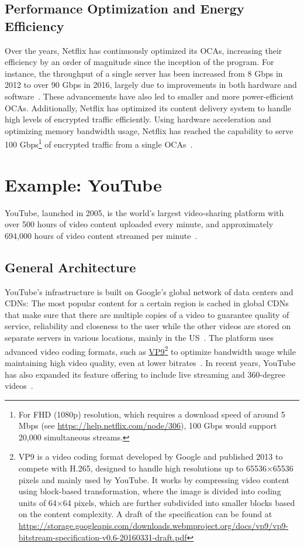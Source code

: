 \subsection{Performance Optimization and Energy Efficiency}

Over the years, Netflix has continuously optimized its \ac{OCAs}, increasing their efficiency by an order of magnitude since the inception of the program. For instance, the throughput of a single server has been increased from 8 Gbps in 2012 to over 90 Gbps in 2016, largely due to improvements in both hardware and software~\parencite{netflix_open_connect}. These advancements have also led to smaller and more power-efficient \ac{OCAs}.
Additionally, Netflix has optimized its content delivery system to handle high levels of encrypted traffic efficiently. Using hardware acceleration and optimizing memory bandwidth usage, Netflix has reached the capability to serve 100 Gbps\footnote{For FHD (1080p) resolution, which requires a download speed of around 5 Mbps (see \url{https://help.netflix.com/node/306}), 100 Gbps would support 20,000 simultaneous streams.} of encrypted traffic from a single \ac{OCAs}~\parencite{netflix_content_serving}.

\section{Example: YouTube}

YouTube, launched in 2005, is the world's largest video-sharing platform with over 500 hours of video content uploaded every minute, and approximately 694,000 hours of video content streamed per minute~\parencite{youtube_stats}.

\subsection{General Architecture}

YouTube's infrastructure is built on Google's global network of data centers and \ac{CDN}s: The most popular content for a certain region is cached in global \ac{CDN}s that make sure that there are multiple copies of a video to guarantee quality of service, reliability and closeness to the user while the other videos are stored on separate servers in various locations, mainly in the US~\parencite{youtube_architecture_2}. The platform uses advanced video coding formats, such as \href{https://developers.google.com/media/vp9}{VP9}\footnote{VP9 is a video coding format developed by Google and published 2013 to compete with H.265, designed to handle high resolutions up to 65536×65536 pixels and mainly used by YouTube. It works by compressing video content using block-based transformation, where the image is divided into coding units of 64×64 pixels, which are further subdivided into smaller blocks based on the content complexity. A draft of the specification can be found at \url{https://storage.googleapis.com/downloads.webmproject.org/docs/vp9/vp9-bitstream-specification-v0.6-20160331-draft.pdf}} to optimize bandwidth usage while maintaining high video quality, even at lower bitrates~\parencite{youtube_vpu}. 
In recent years, YouTube has also expanded its feature offering to include live streaming and 360-degree videos~\parencite{youtube_live}.

